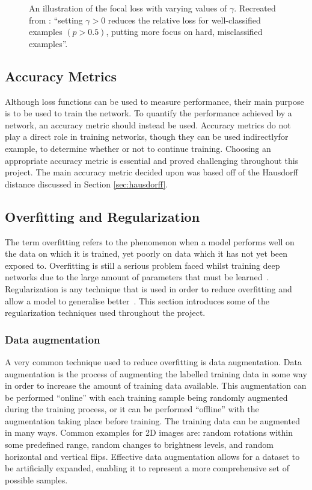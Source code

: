 \begin{figure}[t]
    \centering
    
    \caption{An illustration of the focal loss with varying values of $\gamma$. Recreated from \cite{focalloss}: ``setting $\gamma > 0$ reduces the relative loss for well-classified examples $(p > 0.5)$, putting more focus on hard, misclassified examples''.}
    \label{fig:focal}
\end{figure}

\subsection{Accuracy Metrics}

Although loss functions can be used to measure performance, their main purpose is to be used to train the network. To quantify the performance achieved by a network, an accuracy metric should instead be used. Accuracy metrics do not play a direct role in training networks, though they can be used indirectly\textemdash for example, to determine whether or not to continue training. Choosing an appropriate accuracy metric is essential and proved challenging throughout this project. The main accuracy metric decided upon was based off of the Hausdorff distance discussed in Section \ref{sec:hausdorff}.

\subsection{Overfitting and Regularization}

The term overfitting refers to the phenomenon when a model performs well on the data on which it is trained, yet poorly on data which it has not yet been exposed to. Overfitting is still a serious problem faced whilst training deep networks due to the large amount of parameters that must be learned~\cite{dropout, reducing, overfitavoid}. Regularization is any technique that is used in order to reduce overfitting and allow a model to generalise better~\cite{regular}. This section introduces some of the regularization techniques used throughout the project.

\subsubsection{Data augmentation}

A very common technique used to reduce overfitting is data augmentation. Data augmentation is the process of augmenting the labelled training data in some way in order to increase the amount of training data available. This augmentation can be performed ``online'' with each training sample being randomly augmented during the training process, or it can be performed ``offline'' with the augmentation taking place before training. The training data can be augmented in many ways. Common examples for 2D images are: random rotations within some predefined range, random changes to brightness levels, and random horizontal and vertical flips. Effective data augmentation allows for a dataset to be artificially expanded, enabling it to represent a more comprehensive set of possible samples.

